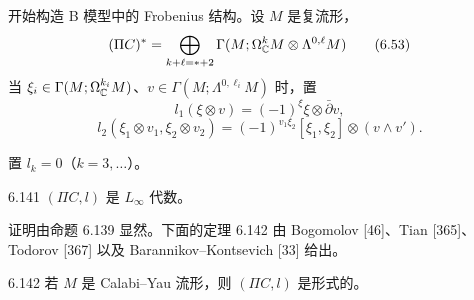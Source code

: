 
开始构造 B 模型中的 Frobenius 结构。设 $M$ 是复流形，
\begin{equation}
  (\Pi C)^*=\bigoplus_{k+\ell=*+2}\Gamma(M;\Omega^k_{\mathbb{C}}M\otimes\Lambda^{0,\ell}M) \tag{6.53}
\end{equation}
当 $\xi_i\in\Gamma(M;\Omega^{k_i}_{\mathbb{C}}M)$、$v\in\Gamma(M;\Lambda^{0,\ell_i}M)$ 时，置
\begin{equation}
  l_1(\xi\otimes v)=(-1)^{\xi}\xi\otimes\bar\partial v, \tag{6.54}
\end{equation}
\begin{equation}
  l_2(\xi_1\otimes v_1,\xi_2\otimes v_2)=(-1)^{v_1\xi_2}[\xi_1,\xi_2]\otimes(v\wedge v'). \tag{6.55}
\end{equation}


置 $l_k=0$（$k=3,\dots$）。

\begin{lemma}{6.141}
  $( \Pi C,l)$ 是 $L_{\infty}$ 代数。
\end{lemma}

证明由命题 6.139 显然。下面的定理 6.142 由 Bogomolov [46]、Tian [365]、Todorov [367] 以及 Barannikov–Kontsevich [33] 给出。

\begin{theorem*}{6.142}
  若 $M$ 是 Calabi–Yau 流形，则 $(\Pi C,l)$ 是形式的。
\end{theorem*}

